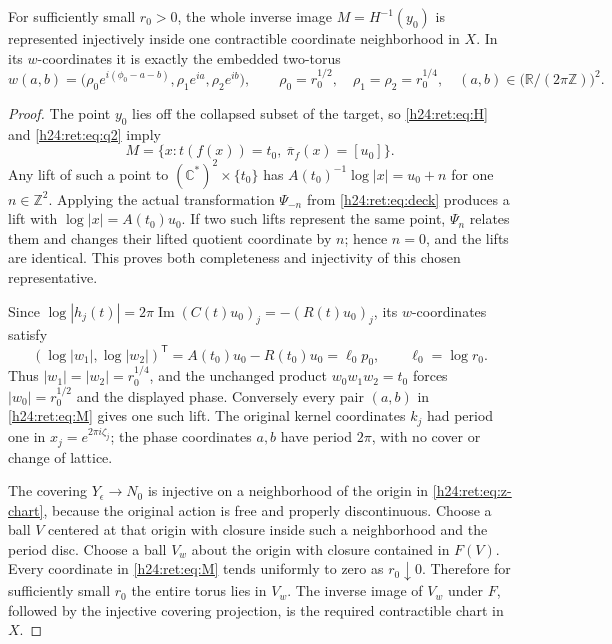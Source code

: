 \begin{lemma}
For sufficiently small \(r_0>0\), the whole inverse image
\(M=H^{-1}(y_0)\) is represented injectively inside one contractible
coordinate neighborhood in \(X\).  In its \(w\)-coordinates it is
exactly the embedded two-torus
\begin{equation}
 w(a,b)=
 \bigl(\rho_0e^{i(\phi_0-a-b)},\rho_1e^{ia},\rho_2e^{ib}\bigr),
 \qquad
 \rho_0=r_0^{1/2},\quad \rho_1=\rho_2=r_0^{1/4},
 \quad (a,b)\in\bigl(\mathbb R/(2\pi\mathbb Z)\bigr)^2.
 \label{h24:ret:eq:M}
\end{equation}
\end{lemma}
\begin{proof}
The point \(y_0\) lies off the collapsed subset of the target, so
\eqref{h24:ret:eq:H} and \eqref{h24:ret:eq:q2} imply
\[
 M=\{x:t(f(x))=t_0,\ \overline\pi_f(x)=[u_0]\}.
\]
Any lift of such a point to \((\mathbb C^*)^2\times\{t_0\}\) has
\(A(t_0)^{-1}\log|x|=u_0+n\) for one \(n\in\mathbb Z^2\).
Applying the actual transformation \(\Psi_{-n}\) from
\eqref{h24:ret:eq:deck} produces a lift with
\(\log|x|=A(t_0)u_0\).  If two such lifts represent the same point,
\(\Psi_n\) relates them and changes their lifted quotient coordinate
by \(n\); hence \(n=0\), and the lifts are identical.  This proves
both completeness and injectivity of this chosen representative.

Since
\(\log|h_j(t)|=2\pi\operatorname{Im}(C(t)u_0)_j
=-(R(t)u_0)_j\), its \(w\)-coordinates satisfy
\[
 (\log|w_1|,\log|w_2|)^{\mathsf T}
 =A(t_0)u_0-R(t_0)u_0=\ell_0p_0,
 \qquad \ell_0=\log r_0.
\]
Thus \(|w_1|=|w_2|=r_0^{1/4}\), and the unchanged product
\(w_0w_1w_2=t_0\) forces \(|w_0|=r_0^{1/2}\) and the displayed
phase.  Conversely every pair \((a,b)\) in \eqref{h24:ret:eq:M} gives one
such lift.  The original kernel coordinates \(k_j\) had period one
in \(x_j=e^{2\pi i\zeta_j}\); the phase coordinates \(a,b\) have
period \(2\pi\), with no cover or change of lattice.

The covering \(Y_\epsilon\to N_0\) is injective on a neighborhood of
the origin in \eqref{h24:ret:eq:z-chart}, because the original action is free
and properly discontinuous.  Choose a ball \(V\) centered at that
origin with closure inside such a neighborhood and the period disc.
Choose a ball \(V_w\) about the origin with closure contained in
\(F(V)\).  Every coordinate in \eqref{h24:ret:eq:M} tends uniformly to zero
as \(r_0\downarrow0\).  Therefore for sufficiently small \(r_0\)
the entire torus lies in \(V_w\).  The inverse image of \(V_w\)
under \(F\), followed by the injective covering projection, is the
required contractible chart in \(X\).
\end{proof}

